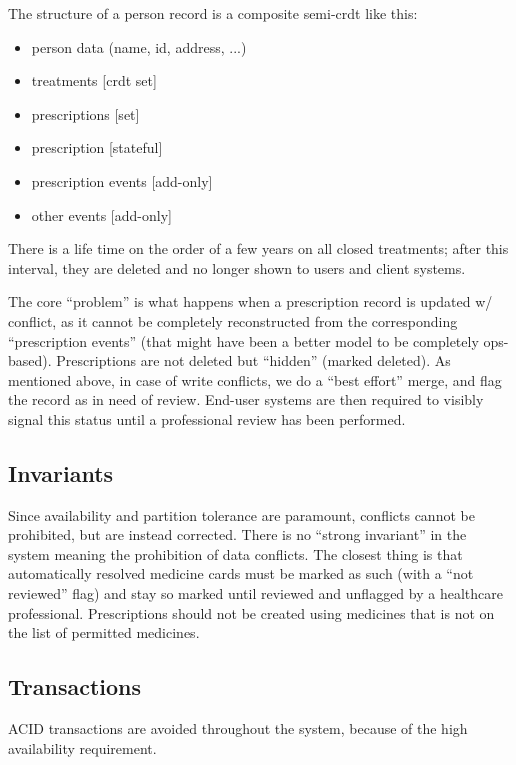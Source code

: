 \documentclass[11pt,a4paper]{report}
\begin{document}
The structure of a person record is a composite semi-\gls{crdt} like this:
\begin{itemize}
\item person data (name, id, address, ...)
\item treatments [\gls{crdt} set]
\item prescriptions [set]
\item prescription [stateful]
\item prescription events [add-only]
\item other events [add-only]
\end{itemize}


There is a life time on the order of a few years on all closed treatments; after this interval, they are deleted and no longer shown to users and client systems.

The core ``problem'' is what happens when a prescription record is updated w/ conflict, as it cannot be completely reconstructed from the corresponding ``prescription events'' (that might have been a better model to be completely ops-based). Prescriptions are not deleted but ``hidden'' (marked deleted). As mentioned above, in case of write conflicts, we do a ``best effort'' merge, and flag the record as in need of review. End-user systems are then required to visibly signal this status until a professional review has been performed.

\subsection{Invariants}
Since availability and partition tolerance are paramount, conflicts cannot be prohibited, but are instead corrected. There is no ``strong invariant'' in the system meaning the prohibition of data conflicts. The closest thing is that automatically resolved medicine cards must be marked as such (with a ``not reviewed'' flag) and stay so marked until reviewed and unflagged by a healthcare professional.
Prescriptions should not be created using medicines that is not on  the list of permitted medicines.

\subsection{Transactions}
ACID transactions are avoided throughout the system, because of the high availability requirement.
\end{document}
